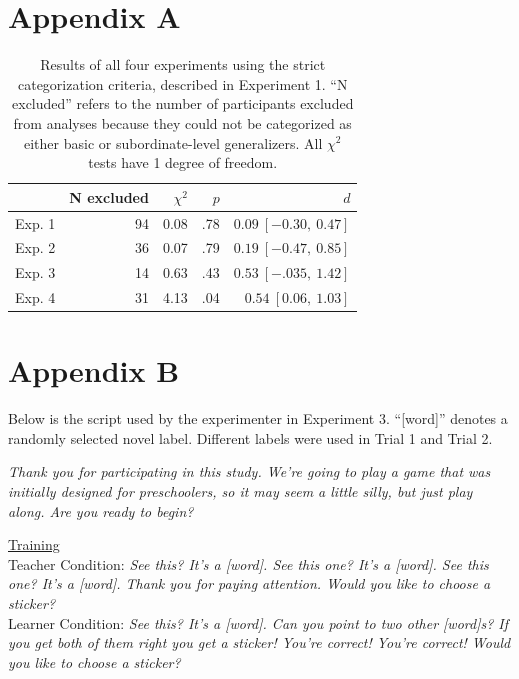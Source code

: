 \documentclass[man]{apa2}
\begin{document}
\section{Appendix A}

\begin{table}[h]
\centering
\begin{tabular}{rrrrr}
 \hline
  & N excluded & $\chi^2$ & $p$ & $d$ \\ 
 \hline
Exp. 1 & 94 & 0.08 & .78 & $0.09\ [-0.30,\ 0.47]$\\ 
Exp. 2 & 36 & 0.07 & .79 & $0.19\ [-0.47,\ 0.85]$ \\ 
Exp. 3 & 14 & 0.63 & .43 & $0.53\ [-.035,\ 1.42]$ \\ 
Exp. 4 & 31 & 4.13 & .04 & $0.54\ [0.06,\ 1.03]$\\ 
  \hline
\end{tabular}
\caption{Results of all four experiments using the strict categorization criteria, described in Experiment 1. ``N excluded'' refers to the number of participants excluded from analyses because they could not be categorized as either basic or subordinate-level generalizers. All $\chi^2$ tests have 1 degree of freedom. }
\label{strictResults}
\end{table}


\section{Appendix B}
Below is the script used by the experimenter in Experiment 3. ``[word]'' denotes a randomly selected novel label. Different labels were used in Trial 1 and Trial 2. 

\vspace{5mm}

{\it Thank you for participating in this study. We're going to play a game that was initially designed for preschoolers, so it may seem a little silly, but just play along. Are you ready to begin?}
\vspace{2.5mm}

\noindent \underline{Training} \\
	Teacher Condition:  {\it See this? It's a [word]. See this one? It's a [word]. See this one? It's a [word]. Thank you for paying attention. Would you like to choose a sticker? }
\\
Learner Condition:  {\it See this? It's a [word].  Can you point to two other [word]s? If you get both of them right you get a sticker!  You're correct!  You're correct! Would you like to choose a sticker? }
\vspace{2.5mm}
 
\end{document}
